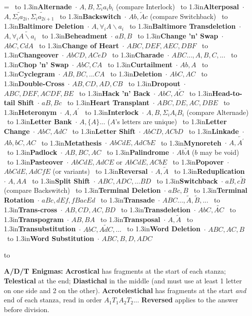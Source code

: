 \def\x#1{\ \hbox to 1.3in{\hss \bf #1}\ $\cdot$}

\voffset -0.5in
\vsize 10in
\hoffset -0.5in
\hsize 7.5in
\parindent 0pt
\nopagenumbers
\frenchspacing

=\vbox{\obeylines\parskip=4pt\hsize
  \x{Alternade} $A, B, \Sigma_ia_ib_i$ (compare Interlock)
  \x{Alterposal} $A, \widetilde{\Sigma_ia_{2i}}, \widetilde{\Sigma_ia_{2i+1}}$
  \x{Backswitch} $Ab, \overleftarrow A c$ (compare Switchback)
  \x{Baltimore Deletion} $A, \forall_i{A\backslash a_i}$
  \x{Baltimore Transdeletion} $A, \forall_i\widetilde{A\backslash a_i}$
  \x{Beheadment} $aB, B$
  \x{Change 'n' Swap} $AbC, CdA$
  \x{Change of Heart} $ABC, DEF, AEC, DBF$
  \x{Changeover} $AbCD, ACeD$
  \x{Charade} $ABC..., A, B, C, ...$
  \x{Chop 'n' Swap} $AbC, CA$
  \x{Curtailment} $Ab, A$
  \x{Cyclegram} $AB, BC, ... CA$
  \x{Deletion} $AbC, AC$
  \x{Double-Cross} $AB, CD, AD, CB$
  \x{Dropout} $ABC, DEF, ACDF, BE$
  \x{Hack 'n' Back} $AbC, A\overleftarrow C$
  \x{Head-to-tail Shift} $aB, Bc$
  \x{Heart Transplant} $ABC, DE, AC, DBE$
  \x{Heteronym} $A, A^\prime$
  \x{Interlock} $A, B, \Sigma_iA_iB_i$ (compare Alternade)
  \x{Letter Bank} $A, \{A\}...$ ($A$'s letters are unique)
  \x{Letter Change} $AbC, AdC$
  \x{Letter Shift} $AbCD, ACbD$
  \x{Linkade} $Ab, bC, AC$
  \x{Metathesis} $AbCdE, AdCbE$
  \x{Mynoreteh} $A, \overleftarrow{A^\prime}$
  \x{Padlock} $AB, BC, AC$
  \x{Palindrome} $Ab\overleftarrow A$ ($b$ may be void)
  \x{Pasteover} $AbCdE, AdCE$ or $AbCdE, ACbE$
  \x{Popover} $AbCdE, AdCfE$ (or variants)
  \x{Reversal} $A, \overleftarrow A$
  \x{Reduplication} $A, AA$
  \x{Split Shift} $ABC, ADC, ... BD$
  \x{Switchback} $aB, c\overleftarrow B$ (compare Backswitch)
  \x{Terminal Deletion} $aBc, B$
  \x{Terminal Rotation} $aBc, dEf, fBa cEd$
  \x{Transade} $ABC..., \tilde A, \tilde B, ...$
  \x{Trans-cross} $AB, CD, AC, BD$
  \x{Transdeletion} $AbC, \widetilde{AC}$
  \x{Transpogram} $AB, BA$
  \x{Transposal} $A, \tilde A$
  \x{Transubstitution} $ AbC, \widetilde{AdC}, ...$
  \x{Word Deletion} $ABC, AC, B$
  \x{Word Substitution} $ABC, B, D, ADC$
}

\hbox to 
\parskip=4pt

{\bf A/D/T Enigmas:} {\bf Acrostical} has fragments at the start of each
stanza; {\bf Telestical} at the end; {\bf Diastichal} in the middle
(and must use at least 1 letter on one side and 2 on the other). {\bf
  Acrotelestichal} has fragments at the start {\it and} end of each
stanza, read in order $A_1T_1A_2T_2...$ {\bf Reversed} applies to the
answer before division.

